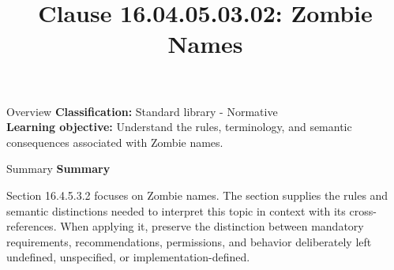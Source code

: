 \documentclass[10pt,letterpaper]{article}
\title{Clause 16.04.05.03.02: Zombie Names}
\author{}
\date{}
\begin{document}
\maketitle
\begin{CornellOverviewBox}{Overview}
\textbf{Classification:} Standard library - Normative\\[2pt]
\textbf{Learning objective:} Understand the rules, terminology, and semantic consequences associated with Zombie names.
\end{CornellOverviewBox}\begin{CornellSummaryBox}{Summary}
{\sffamily\bfseries\color{Accent} Summary}\par\vspace{3pt}Section 16.4.5.3.2 focuses on Zombie names. The section supplies the rules and semantic distinctions needed to interpret this topic in context with its cross-references. When applying it, preserve the distinction between mandatory requirements, recommendations, permissions, and behavior deliberately left undefined, unspecified, or implementation-defined.
\end{CornellSummaryBox}
\end{document}
